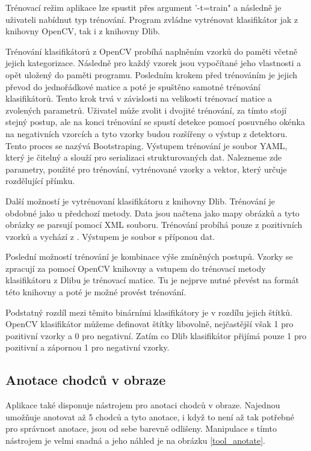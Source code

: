 Trénovací režim aplikace lze spustit přes argument '-t=train" a následně je uživateli nabídnut typ trénování. Program zvládne vytrénovat klasifikátor jak z knihovny OpenCV, tak i z knihovny Dlib. 

Trénování klasifikátorů z OpenCV probíhá naplněním vzorků do paměti včetně jejich kategorizace. Následně pro každý vzorek jsou vypočítané jeho vlastnosti a opět uložený do paměti programu. Posledním krokem před trénováním je jejich převod do jednořádkové matice a poté je spuštěno samotné trénování klasifikátorů. Tento krok trvá v závislosti na velikosti trénovací matice a zvolených parametrů. Uživatel může zvolit i dvojité trénování, za tímto stojí stejný postup, ale na konci trénování se spustí detekce pomocí posuvného okénka na negativních vzorcích a tyto vzorky budou rozšířeny o výstup z detektoru. Tento proces se nazývá Bootstraping. Výstupem trénování je soubor YAML, který je čitelný a slouží pro serializaci strukturovaných dat. Nalezneme zde parametry, použité pro trénování, vytrénované vzorky a vektor, který určuje rozdělující přímku.

Další možností je vytrénovaní klasifikátoru z knihovny Dlib. Trénování je obdobné jako u předchozí metody. Data jsou načtena jako mapy obrázků a tyto obrázky se parsují pomocí XML souboru. Trénování probíhá pouze z pozitivních vzorků a vychází z \cite{hog:dalal}. Výstupem je soubor s příponou dat.

Poslední možností trénování je kombinace výše zmíněných postupů. Vzorky se zpracují za pomocí OpenCV knihovny a vstupem do trénovací metody klasifikátoru z Dlibu je trénovací matice. Tu je nejprve nutné převést na formát této knihovny a poté je možné provést trénování.

Podstatný rozdíl mezi těmito binárními klasifikátory je v rozdílu jejich štítků. OpenCV klasifikátor můžeme definovat štítky libovolně, nejčastější však 1 pro pozitivní vzorky a 0 pro negativní. Zatím co Dlib klasifikátor přijímá pouze 1 pro pozitivní a zápornou 1 pro negativní vzorky.

\subsection{Anotace chodců v obraze}
Aplikace také disponuje nástrojem pro anotaci chodců v obraze. Najednou umožňuje anotovat až 5 chodců a tyto anotace, i když to není až tak potřebné pro správnost anotace, jsou od sebe barevně odlišeny. Manipulace s tímto nástrojem je velmi snadná a jeho náhled je na obrázku \ref{tool_anotate}.

